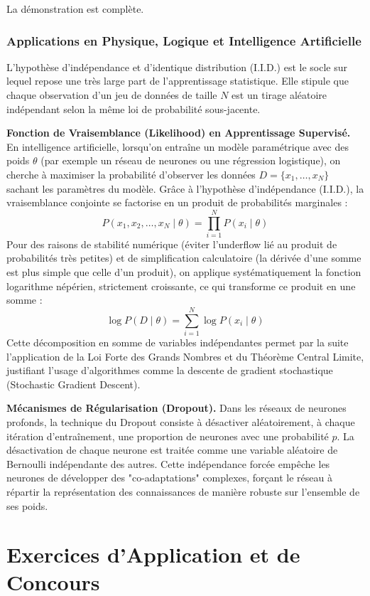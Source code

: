 \documentclass[11pt,a4paper]{article}
\begin{document}
La démonstration est complète.

\section{Applications en Physique, Logique et Intelligence Artificielle}

L'hypothèse d'indépendance et d'identique distribution (I.I.D.) est le socle sur lequel repose une très large part de l'apprentissage statistique. Elle stipule que chaque observation d'un jeu de données de taille $N$ est un tirage aléatoire indépendant selon la même loi de probabilité sous-jacente.

\textbf{Fonction de Vraisemblance (Likelihood) en Apprentissage Supervisé.}
En intelligence artificielle, lorsqu'on entraîne un modèle paramétrique avec des poids $\theta$ (par exemple un réseau de neurones ou une régression logistique), on cherche à maximiser la probabilité d'observer les données $D = \{x_1, \dots, x_N\}$ sachant les paramètres du modèle.
Grâce à l'hypothèse d'indépendance (I.I.D.), la vraisemblance conjointe se factorise en un produit de probabilités marginales :
$$ P(x_1, x_2, \dots, x_N \mid \theta) = \prod_{i=1}^N P(x_i \mid \theta) $$
Pour des raisons de stabilité numérique (éviter l'underflow lié au produit de probabilités très petites) et de simplification calculatoire (la dérivée d'une somme est plus simple que celle d'un produit), on applique systématiquement la fonction logarithme népérien, strictement croissante, ce qui transforme ce produit en une somme :
$$ \log P(D \mid \theta) = \sum_{i=1}^N \log P(x_i \mid \theta) $$
Cette décomposition en somme de variables indépendantes permet par la suite l'application de la Loi Forte des Grands Nombres et du Théorème Central Limite, justifiant l'usage d'algorithmes comme la descente de gradient stochastique (Stochastic Gradient Descent).

\textbf{Mécanismes de Régularisation (Dropout).}
Dans les réseaux de neurones profonds, la technique du Dropout consiste à désactiver aléatoirement, à chaque itération d'entraînement, une proportion de neurones avec une probabilité $p$. La désactivation de chaque neurone est traitée comme une variable aléatoire de Bernoulli indépendante des autres. Cette indépendance forcée empêche les neurones de développer des "co-adaptations" complexes, forçant le réseau à répartir la représentation des connaissances de manière robuste sur l'ensemble de ses poids.


\newpage
\part{Exercices d'Application et de Concours}
\end{document}
